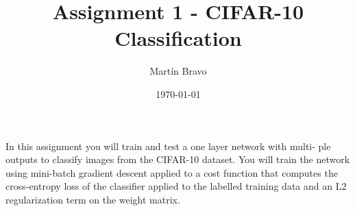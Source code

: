 \documentclass{article}
\title{Assignment 1 - CIFAR-10 Classification}
\author{Martín Bravo}
\date{\today}
\begin{document}
\maketitle

In this assignment you will train and test a one layer network with multi-
ple outputs to classify images from the CIFAR-10 dataset. You will train
the network using mini-batch gradient descent applied to a cost function
that computes the cross-entropy loss of the classifier applied to the labelled
training data and an L2 regularization term on the weight matrix.

\end{document}
